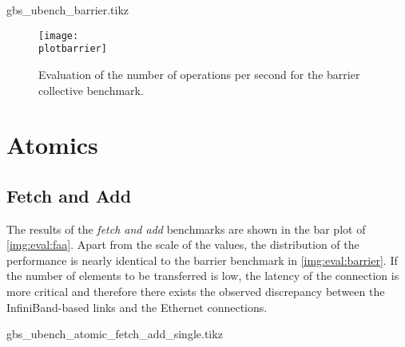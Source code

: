 \newcommand{\plotbarrier}{gbs_ubench_barrier.tikz}
\begin{filecontents}{\plotbarrier}

\datatable
{}
\end{filecontents}

\begin{figure}[htb]
\centering
\texttt{[image: \\plotbarrier]}
\caption{Evaluation of the number of operations per second for the barrier collective benchmark.}
\label{img:eval:barrier}
\end{figure}

\section{Atomics}

\subsection{Fetch and Add}

The results of the \emph{fetch and add} benchmarks are shown in the bar plot of \autoref{img:eval:faa}. Apart from the scale of the values, the distribution of the performance is nearly identical to the barrier benchmark in \autoref{img:eval:barrier}. If the number of elements to be transferred is low, the latency of the connection is more critical and therefore there exists the observed discrepancy between the InfiniBand-based links and the Ethernet connections.


\newcommand{\plotfetchadd}{gbs_ubench_atomic_fetch_add_single.tikz}
\begin{filecontents}{\plotfetchadd}

\datatable
{}
\end{filecontents}

